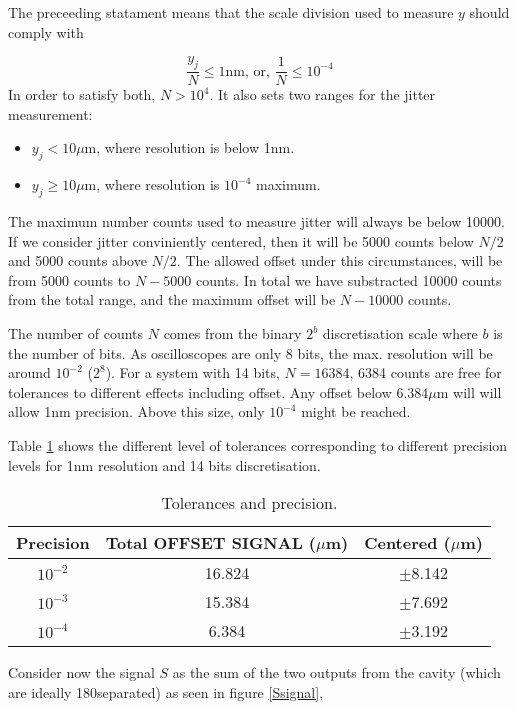 The preceeding statament means that the scale division used to measure $y$ should comply with\par
\begin{equation}
  \frac{y_j}{N}\leq1\text{nm, or, }\frac{1}{N}\leq10^{-4}
\end{equation}
In order to satisfy both, $N>10^{4}$. It also sets two ranges for the jitter measurement:
\begin{itemize}
 \item $y_j<10\mu$m, where resolution is below 1nm.
 \item $y_j\geq10\mu$m, where resolution is $10^{-4}$ maximum.
\end{itemize}
The maximum number counts used to measure jitter will always be below 10000. If we consider jitter conviniently centered, then it will be 5000 counts below $N/2$ and 5000 counts above $N/2$. The allowed offset under this circumstances, will be from 5000 counts to $N-5000$ counts. In total we have substracted 10000 counts from the total range, and the maximum offset will be $N-10000$ counts.\par
The number of counts $N$ comes from the binary $2^b$ discretisation scale where $b$ is the number of bits. As oscilloscopes are only 8 bits, the max. resolution will be around $10^{-2}$ ($2^8$). For a system with 14 bits, $N=16384$,  6384 counts are free for tolerances to different effects including offset. Any offset below $6.384\mu$m will will allow 1nm precision. Above this size, only $10^{-4}$ might be reached.\par
Table \ref{toletab} shows the different level of tolerances corresponding to different precision levels for 1nm resolution and 14 bits discretisation.\par
\begin{table}[hbt]
\begin{center}
 \begin{tabular}{|c|c|c|}\hline
 Precision & Total OFFSET SIGNAL ($\mu$m) & Centered ($\mu$m)\\\hline
 $10^{-2}$ &16.824&$\pm$8.142 \\\hline
 $10^{-3}$ &15.384&$\pm$7.692\\\hline
 $10^{-4}$ &6.384&$\pm$3.192\\\hline
 \end{tabular}
 \caption{Tolerances and precision.}\label{toletab}
 \end{center}
\end{table}
Consider now the signal $S$ as the sum of the two outputs from the cavity (which are ideally 180\degre separated) as seen in figure \ref{Ssignal},\par
